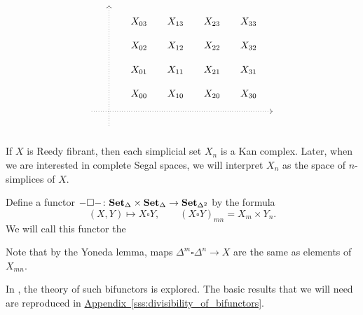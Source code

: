 \documentclass[main.tex]{subfiles}
\begin{document}
\begin{equation*}
  \begin{tikzcd}[row sep=small, column sep=small]
    & \
    \arrow[dddddd, leftarrow, dotted, at start]
    \\
    && X_{03}
    & X_{13}
    & X_{23}
    & X_{33}
    \\
    && X_{02}
    & X_{12}
    & X_{22}
    & X_{32}
    \\
    && X_{01}
    & X_{11}
    & X_{21}
    & X_{31}
    \\
    && X_{00}
    & X_{10}
    & X_{20}
    & X_{30}
    \\
    \
    \arrow[rrrrrr, dotted, at end]
    &&&&&& \
    \\
    & \
  \end{tikzcd}
\end{equation*}

If $X$ is Reedy fibrant, then each simplicial set $X_{n}$ is a Kan complex. Later, when we are interested in complete Segal spaces, we will interpret $X_{n}$ as the space of $n$-simplices of $X$.

\begin{definition}
  Define a functor $- \square -\colon \mathbf{Set}_{\Delta} \times \mathbf{Set}_{\Delta} \to \mathbf{Set}_{\Delta^{2}}$ by the formula
  \begin{equation*}
    (X, Y) \mapsto X \square Y,\qquad (X \square Y)_{mn} = X_{m} \times Y_{n}.
  \end{equation*}
  We will call this functor the \defn{box functor.}
\end{definition}

Note that by the Yoneda lemma, maps $\Delta^{m} \square \Delta^{n} \to X$ are the same as elements of $X_{mn}$.

In \cite{qcats_vs_segal_spaces}, the theory of such bifunctors is explored. The basic results that we will need are reproduced in \hyperref[sss:divisibility_of_bifunctors]{Appendix~\ref*{sss:divisibility_of_bifunctors}}.
\end{document}
